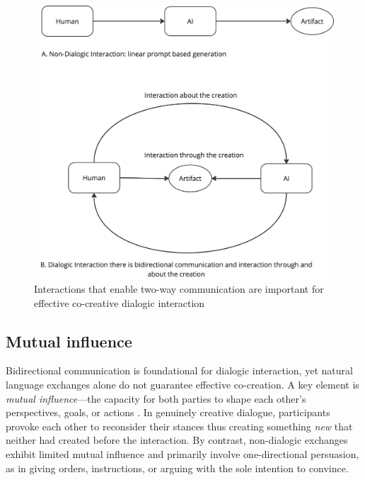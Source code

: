 \begin{figure}
    \centering
    \includegraphics[width=0.75\linewidth]{Bidirectional.png}
    \caption{Interactions that enable two-way communication are important for effective co-creative dialogic interaction}
    \label{fig:enter-label}
\end{figure}

\subsection{Mutual influence}

Bidirectional communication is foundational for dialogic interaction, yet natural language exchanges alone do not guarantee effective co-creation. A key element is \textit{mutual influence}—the capacity for both parties to shape each other’s perspectives, goals, or actions \cite{Bown2020-zn}. In genuinely creative dialogue, participants provoke each other to reconsider their stances thus creating something \textit{new} that neither had created before the interaction. By contrast, non-dialogic exchanges exhibit limited mutual influence and primarily involve one-directional persuasion, as in giving orders, instructions, or arguing with the sole intention to convince.

